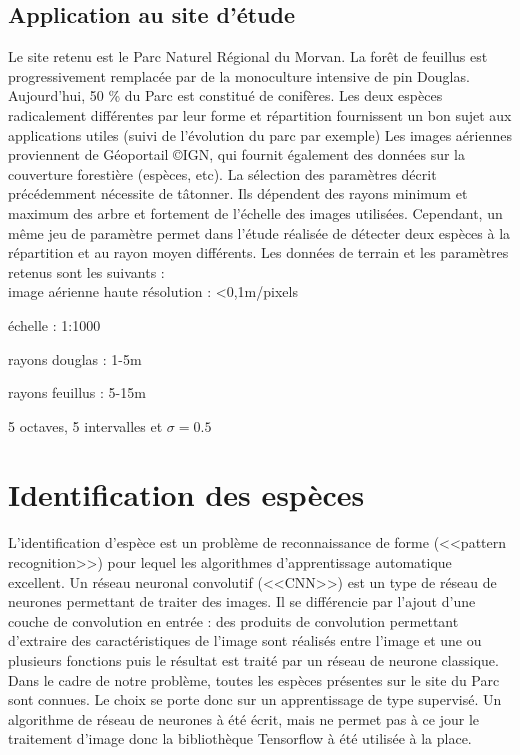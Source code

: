 \documentclass{article}
\begin{document}
	\subsection{Application au site d'étude}
	Le site retenu est le Parc Naturel Régional du Morvan. La forêt de feuillus est progressivement remplacée par de la monoculture intensive de pin Douglas. Aujourd'hui, 50 \% du Parc est constitué de conifères. Les deux espèces radicalement différentes par leur forme et répartition fournissent un bon sujet aux applications utiles (suivi de l'évolution du parc par exemple) 
	Les images aériennes proviennent de Géoportail \copyright IGN, qui fournit également des données sur la couverture forestière (espèces, etc).
	La sélection des paramètres décrit précédemment nécessite de tâtonner. Ils dépendent des rayons minimum et maximum des arbre et fortement de l'échelle des images utilisées. Cependant, un même jeu de paramètre permet dans l'étude réalisée de détecter deux espèces à la répartition et au rayon moyen différents.  
	Les données de terrain et les paramètres retenus sont les suivants :\\
	
	image aérienne haute résolution : <0,1m/pixels

	échelle : 1:1000
	
	rayons douglas : 1-5m
	
	rayons feuillus : 5-15m

	5 octaves, 5 intervalles et $\sigma=0.5$
	
\section{Identification des espèces}

	L'identification d'espèce est un problème de reconnaissance de forme (<<pattern recognition>>) pour lequel les algorithmes d'apprentissage automatique excellent. Un réseau neuronal convolutif (<<CNN>>) est un type de réseau de neurones permettant de traiter des images. Il se différencie par l'ajout d'une couche de convolution en entrée : des produits de convolution permettant d'extraire des caractéristiques de l'image sont réalisés entre l'image et une ou plusieurs fonctions puis le résultat est traité par un réseau de neurone classique. 
	Dans le cadre de notre problème, toutes les espèces présentes sur le site du Parc sont connues. Le choix se porte donc sur un apprentissage de type supervisé.
	Un algorithme de réseau de neurones à été écrit, mais ne permet pas à ce jour le traitement d'image donc la bibliothèque Tensorflow à été utilisée à la place.
\end{document}
